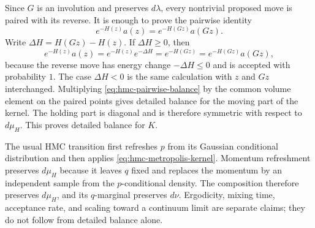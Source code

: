 Since \(G\) is an involution and preserves \(d\lambda\), every nontrivial
proposed move is paired with its reverse.  It is enough to prove the
pairwise identity
\begin{equation}
  e^{-H(z)}a(z)=e^{-H(Gz)}a(Gz).
  \label{eq:hmc-pairwise-balance}
\end{equation}
Write \(\Delta H=H(Gz)-H(z)\).  If \(\Delta H\geq0\), then
\[
  e^{-H(z)}a(z)
  =
  e^{-H(z)}e^{-\Delta H}
  =
  e^{-H(Gz)}
  =
  e^{-H(Gz)}a(Gz),
\]
because the reverse move has energy change \(-\Delta H\leq0\) and is
accepted with probability \(1\).  The case \(\Delta H<0\) is the same
calculation with \(z\) and \(Gz\) interchanged.  Multiplying
\eqref{eq:hmc-pairwise-balance} by the common volume element on the paired
points gives detailed balance for the moving part of the kernel.  The
holding part is diagonal and is therefore symmetric with respect to
\(d\mu_H\).  This proves detailed balance for \(K\).

The usual HMC transition first refreshes \(p\) from its Gaussian conditional
distribution and then applies \eqref{eq:hmc-metropolis-kernel}.  Momentum
refreshment preserves \(d\mu_H\) because it leaves \(q\) fixed and replaces
the momentum by an independent sample from the \(p\)-conditional density.
The composition therefore preserves \(d\mu_H\), and its \(q\)-marginal
preserves \(d\nu\).  Ergodicity, mixing time, acceptance rate, and scaling
toward a continuum limit are separate claims; they do not follow from
detailed balance alone.

